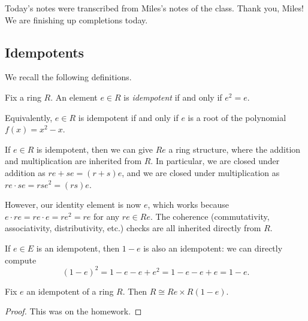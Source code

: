 
Today's notes were transcribed from Miles's notes of the class. Thank you, Miles! We are finishing up completions today.

\subsection{Idempotents}
We recall the following definitions.
\begin{definition}[Idempotent]
	Fix a ring $R$. An element $e\in R$ is \textit{idempotent} if and only if $e^2=e$.
\end{definition}
\begin{remark}
	Equivalently, $e\in R$ is idempotent if and only if $e$ is a root of the polynomial $f(x)=x^2-x$.
\end{remark}
\begin{remark}
	If $e\in R$ is idempotent, then we can give $Re$ a ring structure, where the addition and multiplication are inherited from $R$. In particular, we are closed under addition as $re+se=(r+s)e$, and we are closed under multiplication as $re\cdot se=rse^2=(rs)e$.
	
	However, our identity element is now $e$, which works because $e\cdot re=re\cdot e=re^2=re$ for any $re\in Re$. The coherence (commutativity, associativity, distributivity, etc.) checks are all inherited directly from $R$.
\end{remark}
\begin{example} \label{ex:subfromoneidemp}
	If $e\in E$ is an idempotent, then $1-e$ is also an idempotent: we can directly compute
	\[(1-e)^2=1-e-e+e^2=1-e-e+e=1-e.\]
\end{example}
\begin{lemma} \label{lem:basicidempdecomp}
	Fix $e$ an idempotent of a ring $R$. Then $R\cong Re\times R(1-e)$.
\end{lemma}
\begin{proof}
	This was on the homework.
\end{proof}

